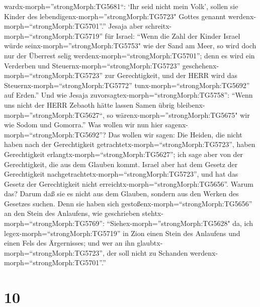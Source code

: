 wardx-morph=''strongMorph:TG5681``: `Ihr seid nicht mein Volk', sollen
sie Kinder des lebendigenx-morph=''strongMorph:TG5723" Gottes genannt
werdenx-morph=``strongMorph:TG5701''.''  Jesaja aber
schreitx-morph=``strongMorph:TG5719'' für Israel: ``Wenn die Zahl der
Kinder Israel würde seinx-morph=''strongMorph:TG5753" wie der Sand am
Meer, so wird doch nur der Überrest selig
werdenx-morph=``strongMorph:TG5701'';  denn es wird ein
Verderben und Steuernx-morph=``strongMorph:TG5723''
geschehenx-morph=``strongMorph:TG5723'' zur Gerechtigkeit, und der HERR
wird das Steuernx-morph=``strongMorph:TG5772''
tunx-morph=``strongMorph:TG5692'' auf Erden.''  Und wie
Jesaja zuvorsagtex-morph=``strongMorph:TG5758'': ``Wenn uns nicht der
HERR Zebaoth hätte lassen Samen übrig
bleibenx-morph=''strongMorph:TG5627``, so
wärenx-morph=''strongMorph:TG5675" wir wie Sodom und Gomorra.''
 Was wollen wir nun hier
sagenx-morph=``strongMorph:TG5692''? Das wollen wir sagen: Die Heiden,
die nicht haben nach der Gerechtigkeit
getrachtetx-morph=``strongMorph:TG5723'', haben Gerechtigkeit
erlangtx-morph=``strongMorph:TG5627''; ich sage aber von der
Gerechtigkeit, die aus dem Glauben kommt.  Israel aber hat
dem Gesetz der Gerechtigkeit
nachgetrachtetx-morph=``strongMorph:TG5723'', und hat das Gesetz der
Gerechtigkeit nicht erreichtx-morph=``strongMorph:TG5656''.
 Warum das? Darum daß sie es nicht aus dem Glauben, sondern
aus den Werken des Gesetzes suchen. Denn sie haben sich
gestoßenx-morph=``strongMorph:TG5656'' an den Stein des Anlaufens,
 wie geschrieben stehtx-morph=``strongMorph:TG5769'':
``Siehex-morph=''strongMorph:TG5628" da, ich
legex-morph=``strongMorph:TG5719'' in Zion einen Stein des Anlaufens und
einen Fels des Ärgernisses; und wer an ihn
glaubtx-morph=``strongMorph:TG5723'', der soll nicht zu Schanden
werdenx-morph=``strongMorph:TG5701''.''

\hypertarget{section-9}{%
\section{10}\label{section-9}}

